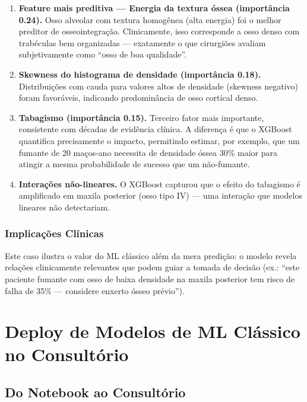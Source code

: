 \begin{enumerate}
    \item \textbf{Feature mais preditiva — Energia da textura óssea (importância 0.24).} Osso alveolar com textura homogênea (alta energia) foi o melhor preditor de osseointegração. Clinicamente, isso corresponde a osso denso com trabéculas bem organizadas — exatamente o que cirurgiões avaliam subjetivamente como ``osso de boa qualidade''.
    
    \item \textbf{Skewness do histograma de densidade (importância 0.18).} Distribuições com cauda para valores altos de densidade (skewness negativo) foram favoráveis, indicando predominância de osso cortical denso.
    
    \item \textbf{Tabagismo (importância 0.15).} Terceiro fator mais importante, consistente com décadas de evidência clínica. A diferença é que o XGBoost quantifica precisamente o impacto, permitindo estimar, por exemplo, que um fumante de 20 maços-ano necessita de densidade óssea 30\% maior para atingir a mesma probabilidade de sucesso que um não-fumante.
    
    \item \textbf{Interações não-lineares.} O XGBoost capturou que o efeito do tabagismo é amplificado em maxila posterior (osso tipo IV) — uma interação que modelos lineares não detectariam.
\end{enumerate}

\subsubsection{Implicações Clínicas}

Este caso ilustra o valor do ML clássico além da mera predição: o modelo revela relações clinicamente relevantes que podem guiar a tomada de decisão (ex.: ``este paciente fumante com osso de baixa densidade na maxila posterior tem risco de falha de 35\% — considere enxerto ósseo prévio'').

\section{Deploy de Modelos de ML Clássico no Consultório}

\subsection{Do Notebook ao Consultório}


